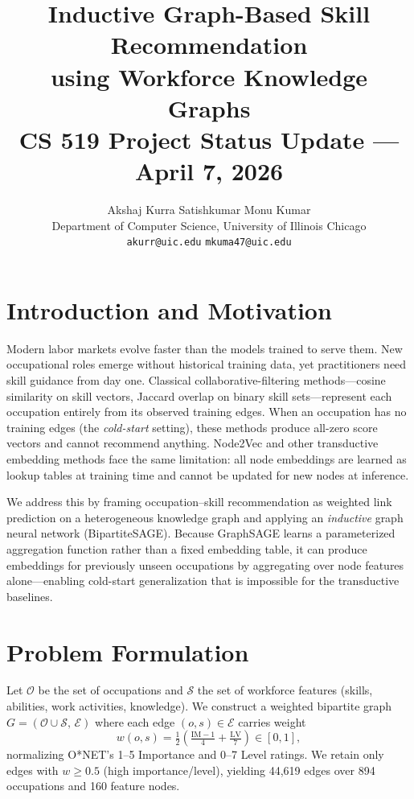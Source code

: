 \documentclass{article}
\title{Inductive Graph-Based Skill Recommendation\\
       using Workforce Knowledge Graphs\\[4pt]
       \large CS 519 Project Status Update --- April 7, 2026}
\author{
  Akshaj Kurra Satishkumar \quad Monu Kumar \\
  Department of Computer Science, University of Illinois Chicago \\
  \texttt{akurr@uic.edu} \quad \texttt{mkuma47@uic.edu}
}
\begin{document}
\maketitle

\section{Introduction and Motivation}

Modern labor markets evolve faster than the models trained to serve them.
New occupational roles emerge without historical training data, yet
practitioners need skill guidance from day one.
Classical collaborative-filtering methods---cosine similarity on skill
vectors, Jaccard overlap on binary skill sets---represent each occupation
entirely from its observed training edges.
When an occupation has no training edges (the \emph{cold-start} setting),
these methods produce all-zero score vectors and cannot recommend anything.
Node2Vec and other transductive embedding methods face the same limitation:
all node embeddings are learned as lookup tables at training time and cannot
be updated for new nodes at inference.

We address this by framing occupation--skill recommendation as weighted
link prediction on a heterogeneous knowledge graph and applying an
\emph{inductive} graph neural network (BipartiteSAGE).
Because GraphSAGE learns a parameterized aggregation function rather than a
fixed embedding table, it can produce embeddings for previously unseen
occupations by aggregating over node features alone---enabling cold-start
generalization that is impossible for the transductive baselines.

\section{Problem Formulation}

Let $\mathcal{O}$ be the set of occupations and $\mathcal{S}$ the set of
workforce features (skills, abilities, work activities, knowledge).
We construct a weighted bipartite graph
$G = (\mathcal{O} \cup \mathcal{S},\,\mathcal{E})$
where each edge $(o,s)\in\mathcal{E}$ carries weight
\[
  w(o,s) = \tfrac{1}{2}\!\left(\tfrac{\mathrm{IM}-1}{4}
           + \tfrac{\mathrm{LV}}{7}\right) \in [0,1],
\]
normalizing O*NET's 1--5 Importance and 0--7 Level ratings.
We retain only edges with $w \geq 0.5$ (high importance/level), yielding
44,619 edges over 894 occupations and 160 feature nodes.
\end{document}
